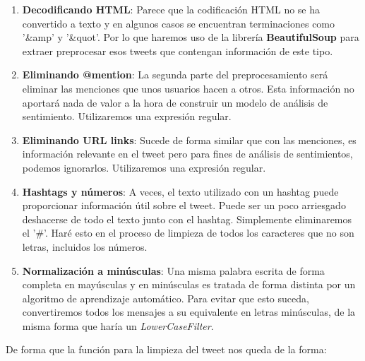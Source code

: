 \documentclass[a4paper,12pt]{report}
\begin{document}
\begin{enumerate}

\item \textbf{Decodificando HTML}: Parece que la codificación HTML no se ha convertido a texto y en algunos casos se encuentran terminaciones como '\&amp' y '\&quot'. Por lo que haremos uso de la librería \textbf{BeautifulSoup} para extraer preprocesar esos tweets que contengan información de este tipo.

\item \textbf{Eliminando @mention}: La segunda parte del preprocesamiento será eliminar las menciones que unos usuarios hacen a otros. Esta información no aportará nada de valor a la hora de construir un modelo de análisis de sentimiento. Utilizaremos una expresión regular. 

\item \textbf{Eliminando URL links}: Sucede de forma similar que con las menciones, es información relevante en el tweet pero para fines de análisis de sentimientos, podemos ignorarlos. Utilizaremos una expresión regular.

\item \textbf{Hashtags y números}: A veces, el texto utilizado con un hashtag puede proporcionar información útil sobre el tweet. Puede ser un poco arriesgado deshacerse de todo el texto junto con el hashtag. Simplemente eliminaremos el '\#'. Haré esto en el proceso de limpieza de todos los caracteres que no son letras, incluidos los números. 

\item \textbf{Normalización a minúsculas}: Una misma palabra escrita de forma completa en mayúsculas y en minúsculas es tratada de forma distinta por un algoritmo de aprendizaje automático. Para evitar que esto suceda, convertiremos todos los mensajes a su equivalente en letras minúsculas, de la misma forma que haría un \textit{LowerCaseFilter}.

\end{enumerate}

De forma que la función para la limpieza del tweet nos queda de la forma: 
\end{document}
